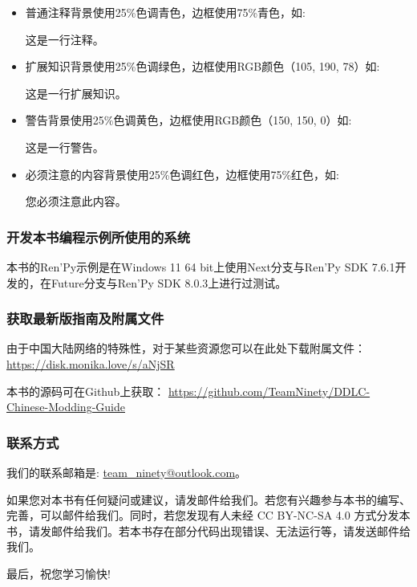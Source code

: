 \documentclass[../Main.tex]{subfiles}
\begin{document}
\begin{itemize}
    同时，本书分为4种注释类型:
    \item 普通注释背景使用25\%色调青色，边框使用75\%青色，如:
    \begin{Comment}
这是一行注释。
    \end{Comment}
    \item 扩展知识背景使用25\%色调绿色，边框使用RGB颜色（105, 190, 78）如:
    \begin{ExtraKnowledge}
    这是一行扩展知识。
    \end{ExtraKnowledge}
    \item 警告背景使用25\%色调黄色，边框使用RGB颜色（150, 150, 0）如:
    \begin{Warning}
    这是一行警告。
    \end{Warning}
    \item 必须注意的内容背景使用25\%色调红色，边框使用75\%红色，如:
    \begin{Attention}
    您必须注意此内容。
    \end{Attention}
\end{itemize}

\subsubsection*{开发本书编程示例所使用的系统}
本书的Ren'Py示例是在Windows 11 64 bit上使用Next分支与Ren'Py SDK 7.6.1开发的，在Future分支与Ren'Py SDK 8.0.3上进行过测试。

\subsubsection*{获取最新版指南及附属文件}
由于中国大陆网络的特殊性，对于某些资源您可以在此处下载附属文件：
\url{https://disk.monika.love/s/aNjSR}

本书的源码可在Github上获取：
\url{https://github.com/TeamNinety/DDLC-Chinese-Modding-Guide}

\subsubsection*{联系方式}
我们的联系邮箱是: \url{team_ninety@outlook.com}。
\newline\newline\par
如果您对本书有任何疑问或建议，请发邮件给我们。若您有兴趣参与本书的编写、完善，可以邮件给我们。同时，若您发现有人未经 CC BY-NC-SA 4.0 方式分发本书，请发邮件给我们。若本书存在部分代码出现错误、无法运行等，请发送邮件给我们。

最后，祝您学习愉快!
\end{document}
